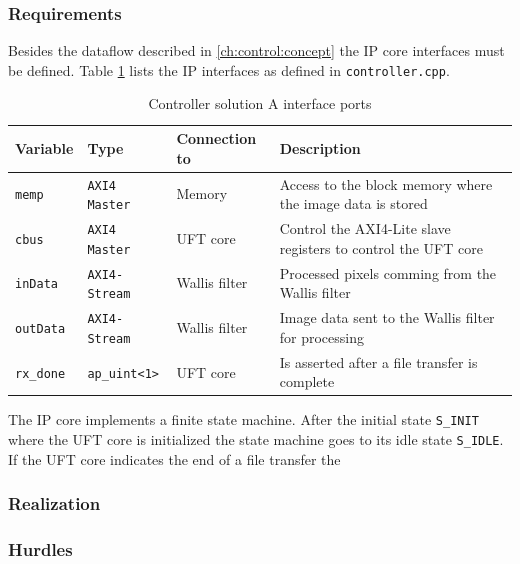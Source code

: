 \subsubsection*{Requirements}
Besides the dataflow described in \ref{ch:control:concept} the IP core
interfaces must be defined. Table \ref{tab:controlleraports} lists the IP
interfaces as defined in \texttt{controller.cpp}.

\begin{table}[t!]
    \centering
    \begin{tabular}{l l l p{8cm}}
        \toprule
        Variable & Type & Connection to & Description \\
        \midrule
        \texttt{memp} & \texttt{AXI4 Master} & Memory &
        Access to the block memory where the image data is stored
        \\
        \texttt{cbus} & \texttt{AXI4 Master} & UFT core &
        Control the AXI4-Lite slave registers to control the UFT core
        \\
        \texttt{inData} & \texttt{AXI4-Stream} & Wallis filter &
        Processed pixels comming from the Wallis filter
        \\
        \texttt{outData} & \texttt{AXI4-Stream} & Wallis filter &
        Image data sent to the Wallis filter for processing
        \\
        \texttt{rx\_done} & \texttt{ap\_uint<1>} & UFT core &
        Is asserted after a file transfer is complete
        \\
        \bottomrule
    \end{tabular}
    \caption{Controller solution A interface ports}
    \label{tab:controlleraports}
\end{table}

The IP core implements a finite state machine. After the initial state 
\texttt{S\_INIT} where the UFT core is initialized the state machine goes to its
idle state \texttt{S\_IDLE}. If the UFT core indicates the end of a file
transfer the 

\subsubsection*{Realization}

\subsubsection*{Hurdles}

